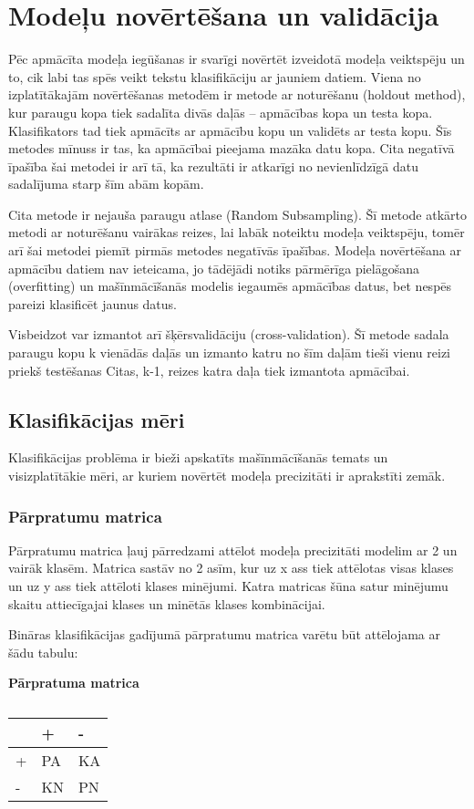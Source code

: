 \section{Modeļu novērtēšana un validācija}
Pēc apmācīta modeļa iegūšanas ir svarīgi novērtēt izveidotā modeļa veiktspēju un to, cik labi tas spēs veikt tekstu klasifikāciju ar jauniem datiem. 
Viena no izplatītākajām novērtēšanas metodēm ir metode ar noturēšanu (holdout method), kur paraugu kopa tiek sadalīta divās daļās – apmācības kopa un testa kopa. Klasifikators tad tiek apmācīts ar apmācību kopu un validēts ar testa kopu. Šīs metodes mīnuss ir tas, ka apmācībai pieejama mazāka datu kopa. Cita negatīvā īpašība šai metodei ir arī tā, ka rezultāti ir atkarīgi no nevienlīdzīgā datu sadalījuma starp šīm abām kopām.

Cita metode ir nejauša paraugu atlase (Random Subsampling). Šī metode atkārto metodi ar noturēšanu vairākas reizes, lai labāk noteiktu modeļa veiktspēju, tomēr arī šai metodei piemīt pirmās metodes negatīvās īpašības.
Modeļa novērtēšana ar apmācību datiem nav ieteicama, jo tādējādi notiks pārmērīga pielāgošana (overfitting) un mašīnmācīšanās modelis iegaumēs apmācības datus, bet nespēs pareizi klasificēt jaunus datus.

Visbeidzot var izmantot arī šķērsvalidāciju (cross-validation). Šī metode sadala paraugu kopu k vienādās daļās un izmanto katru no šīm daļām tieši vienu reizi priekš testēšanas  Citas, k-1, reizes katra daļa tiek izmantota apmācībai.

\subsection{Klasifikācijas mēri}
\renewcommand{\theequation}{2.\arabic{equation}}
Klasifikācijas problēma ir bieži apskatīts mašīnmācīšanās temats un visizplatītākie mēri, ar kuriem novērtēt modeļa precizitāti ir aprakstīti zemāk.

\subsubsection{Pārpratumu matrica}
Pārpratumu matrica ļauj pārredzami attēlot modeļa precizitāti modelim ar 2 un vairāk klasēm. Matrica sastāv no 2 asīm, kur uz x ass tiek attēlotas visas klases un uz y ass tiek attēloti klases minējumi. Katra matricas šūna satur minējumu skaitu attiecīgajai klases un minētās klases kombinācijai.

Bināras klasifikācijas gadījumā pārpratumu matrica varētu būt attēlojama ar šādu tabulu:
\begin{table}[H]
\centering
\caption{\label{tab:novertejums}}
\textbf{Pārpratuma matrica\\}
\begin{tabular}{|l|l|l|}
\hline
  & +  & -  \\ \hline
+ & PA & KA \\ \hline
- & KN & PN \\ \hline
\end{tabular}
\end{table}

